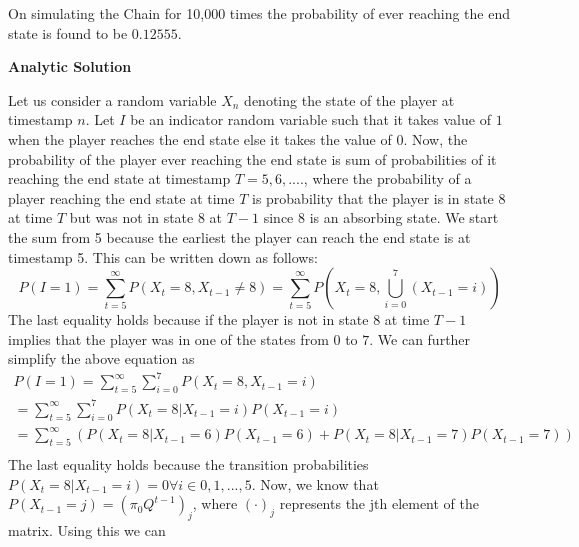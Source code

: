\documentclass{article}
\begin{document}
\begin{enumerate}
	    \noindent %
        On simulating the Chain for 10,000 times the probability of ever reaching the end state is found to be $0.12555$.

        \textbf{Analytic Solution} \par
	
	    \noindent %
        Let us consider a random variable $X_{n}$ denoting the state of the player at timestamp $n$. Let $I$ be an indicator random 
        variable such that it takes value of $1$ when the player reaches the end state else it takes the value of $0$. Now, the 
        probability of the player ever reaching the end state is sum of probabilities of it reaching the end state at timestamp 
        $T=5, 6, .... $, where the probability of a player reaching the end state at time $T$ is probability that the player is in state
        8 at time $T$ but was not in state 8 at $T-1$ since 8 is an absorbing state. We start the sum from 5 because the earliest the player can reach the end state is 
        at timestamp 5. This can be written down as follows:
        \begin{equation}
        \nonumber
            P(I = 1) = \sum_{t=5}^{\infty} P(X_{t} = 8, X_{t-1} \neq 8) = \sum_{t=5}^{\infty} P\left (X_{t} = 8, \bigcup_{i=0}^{7} (X_{t-1} = i) \right )
        \end{equation}
        The last equality holds because if the player is not in state 8 at time $T-1$ implies that the player was in one of the states 
        from $0$ to $7$. We can 
        further simplify the above equation as
        \begin{equation}
        \nonumber
        \begin{gathered}
            P(I = 1) = \sum_{t=5}^{\infty} \sum_{i=0}^{7} P(X_{t} = 8, X_{t-1} = i)\\
                     = \sum_{t=5}^{\infty} \sum_{i=0}^{7} P(X_{t} = 8 | X_{t-1} = i)P(X_{t-1} = i) \\
                     = \sum_{t=5}^{\infty} (P(X_{t} = 8 | X_{t-1} = 6)P(X_{t-1} = 6) +  P(X_{t} = 8 | X_{t-1} = 7)P(X_{t-1} = 7))\\
        \end{gathered}
        \end{equation}
        The last equality holds because the transition probabilities $P(X_{t} = 8 | X_{t-1} = i) = 0 \forall i \in {0,1,...,5}$. Now, we
        know that $P(X_{t-1} = j) = (\pi_{0}Q^{t-1})_{j}$, where $(\cdot)_{j}$ represents the jth element of the matrix. Using this we can

\end{enumerate}
\end{document}
